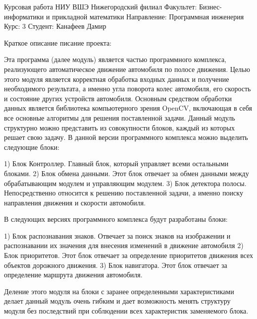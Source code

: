 
\begin{DoxyPre}
Курсовая работа
НИУ ВШЭ Нижегородский филиал
Факультет: Бизнес-информатики и прикладной математики
Направление: Программная инженерия
Курс: 3
Студент: Канафеев Дамир
\end{DoxyPre}
 Краткое описание писание проекта\+:

Эта программа (далее модуль) является частью программного комплекса, реализующего автоматическое движение автомобиля по полосе движения. Целью этого модуля является корректная обработка входных данных и получение необходимого результата, а именно угла поворота колес автомобиля, его скорость и состояние других устройств автомобиля. Основным средством обработки данных является библиотека компьютерного зрения Open\+C\+V, включающая в себя все основные алгоритмы для решения поставленной задачи. Данный модуль структурно можно представить из совокупности блоков, каждый из которых решает свою задачу. В данной версии программного комплекса можно выделить следующие блоки\+: 
\begin{DoxyPre}
1) Блок Контроллер. Главный блок, который управляет всеми остальными блоками.
2) Блок обмена данными. Этот блок отвечает за обмен данными между обрабатывающим модулем и управляющим модулем.
3) Блок детектора полосы. Непосредственно относится к решению поставленной задачи, а именно поиску направления движения и скорости автомобиля.
\end{DoxyPre}
 В следующих версиях программного комплекса будут разработаны блоки\+: 
\begin{DoxyPre}
1) Блок распознавания знаков. Отвечает за поиск знаков на изображении и распознавании их значения для внесения изменений в движение автомобиля
2) Блок приоритетов. Этот блок отвечает за определение приоритетов движения всех объектов дорожного движения.
3) Блок навигатора. Этот блок отвечает за определение маршрута движения автомобиля.
\end{DoxyPre}
 Деление этого модуля на блоки с заранее определенными характеристиками делает данный модуль очень гибким и дает возможность менять структуру модуля без последствий при соблюдении всех характеристик заменяемого блока. 